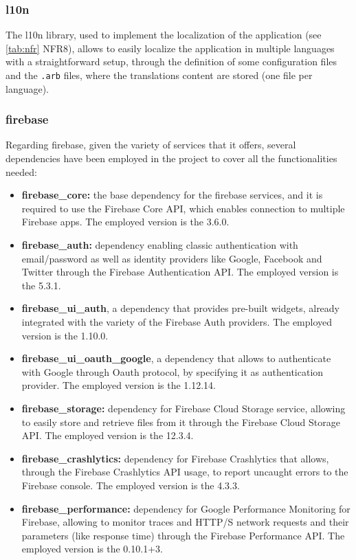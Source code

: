 \subsubsection{l10n}
The l10n library, used to implement the localization of the application (see \cref{tab:nfr} NFR8), allows to easily localize the application in multiple languages with a straightforward setup, through the definition of some configuration files and the \texttt{.arb} files, where the translations content are stored (one file per language). 
\newpage
\subsubsection{firebase}
Regarding firebase, given the variety of services that it offers, several dependencies have been employed in the project to cover all the functionalities needed:

\begin{itemize}[nosep] %
    \item \textbf{firebase\_core:} the base dependency for the firebase services, and it is required to use the Firebase Core API, which enables connection to multiple Firebase apps. The employed version is the 3.6.0.
    \item \textbf{firebase\_auth:} dependency enabling classic authentication with email/password as well as identity providers like Google, Facebook and Twitter through the Firebase Authentication API. The employed version is the 5.3.1.
    \item \textbf{firebase\_ui\_auth}, a dependency that provides pre-built widgets, already integrated with the variety of the Firebase Auth providers. The employed version is the 1.10.0.
    \item \textbf{firebase\_ui\_oauth\_google}, a dependency that allows to authenticate with Google through Oauth protocol, by specifying it as authentication provider. The employed version is the 1.12.14.
    \item \textbf{firebase\_storage:} dependency for Firebase Cloud Storage service, allowing to easily store and retrieve files from it through the Firebase Cloud Storage API. The employed version is the 12.3.4.
    \item \textbf{firebase\_crashlytics:} dependency for Firebase Crashlytics that allows, through the Firebase Crashlytics API usage, to report uncaught errors to the Firebase console. The employed version is the 4.3.3.
    \item \textbf{firebase\_performance:} dependency for Google Performance Monitoring for Firebase, allowing to monitor traces and HTTP/S network requests and their parameters (like response time) through the Firebase Performance API. The employed version is the 0.10.1+3.
\end{itemize}

